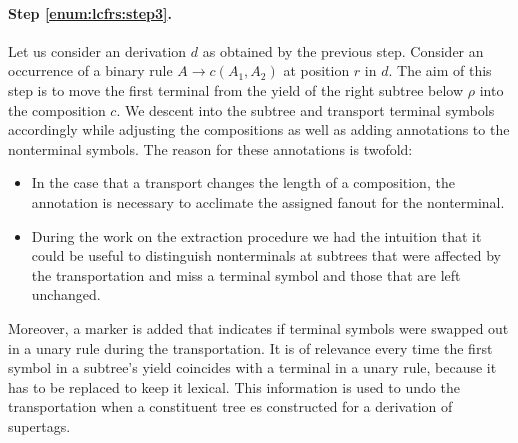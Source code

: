 \documentclass[../../document.tex]{subfiles}
\begin{document}
    \paragraph{Step \ref{enum:lcfrs:step3}.}
    Let us consider an  derivation \(d\) as obtained by the previous step.
    Consider an occurrence of a binary rule $A \to c(A_1, A_2)$ at position \(r\) in \(d\).
    The aim of this step is to move the first terminal from the yield of the right subtree below \(\rho\) into the composition \(c\).
    We descent into the subtree and transport terminal symbols accordingly while adjusting the compositions as well as adding annotations to the nonterminal symbols.
    The reason for these annotations is twofold:
    \begin{itemize}
        \item In the case that a transport changes the length of a composition, the annotation is necessary to acclimate the assigned fanout for the  nonterminal.
        \item
            During the work on the extraction procedure we had the intuition that it could be useful to distinguish nonterminals at subtrees that were affected by the transportation and miss a terminal symbol and those that are left unchanged.
    \end{itemize}
    Moreover, a marker is added that indicates if terminal symbols were swapped out in a unary rule during the transportation.
    It is of relevance every time the first symbol in a subtree's yield coincides with a terminal in a unary rule, because it has to be replaced to keep it lexical.
    This information is used to undo the transportation when a constituent tree es constructed for a derivation of supertags.
\end{document}
